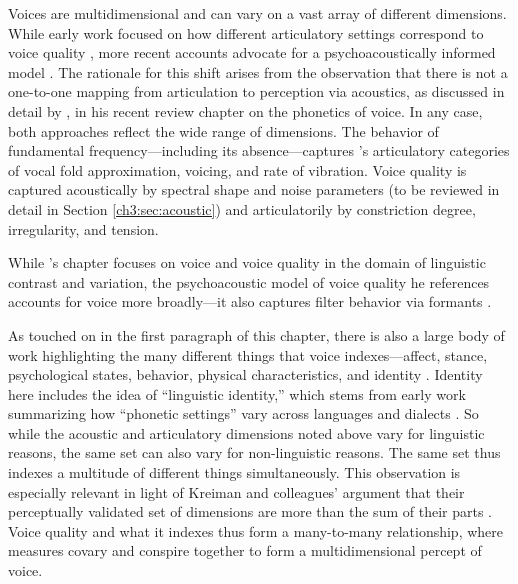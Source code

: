 Voices are multidimensional and can vary on a vast array of different dimensions. While early work focused on how different articulatory settings correspond to voice quality \citep{laver_1980_phonetic, pittam_1987_lts}, more recent accounts advocate for a psychoacoustically informed model \citep{kreiman_2014_theory}. The rationale for this shift arises from the observation that there is not a one-to-one mapping from articulation to perception via acoustics, as discussed in detail by \citet{garellek_2019_voice}, in his recent review chapter on the phonetics of voice. In any case, both approaches reflect the wide range of dimensions. The behavior of fundamental frequency---including its absence---captures \citeauthor{garellek_2019_voice}'s articulatory categories of vocal fold approximation, voicing, and rate of vibration. Voice quality is captured acoustically by spectral shape and noise parameters (to be reviewed in detail in Section \ref{ch3:sec:acoustic}) and articulatorily by constriction degree, irregularity, and tension. 

While \citeauthor{garellek_2019_voice}'s \citeyear{garellek_2019_voice} chapter focuses on voice and voice quality in the domain of linguistic contrast and variation, the psychoacoustic model of voice quality he references accounts for voice more broadly---it also captures filter behavior via formants \citep{kreiman_2014_theory}. 

As touched on in the first paragraph of this chapter, there is also a large body of work highlighting the many different things that voice indexes---affect, stance, psychological states, behavior, physical characteristics, and identity \citep{podesva_2015_voice}. Identity here includes the idea of ``linguistic identity,'' which stems from early work summarizing how ``phonetic settings'' vary across languages and dialects \citep[see][]{podesva_2015_voice, pittam_1987_lts,mennen_2010_settings}. So while the acoustic and articulatory dimensions noted above vary for linguistic reasons, the same set can also vary for non-linguistic reasons. The same set thus indexes a multitude of different things simultaneously. This observation is especially relevant in light of Kreiman and colleagues' argument that their perceptually validated set of dimensions are more than the sum of their parts \citep{kreiman_2014_theory, kreiman_2021_validating}. Voice quality and what it indexes thus form a many-to-many relationship, where measures covary and conspire together to form a multidimensional percept of voice. 

